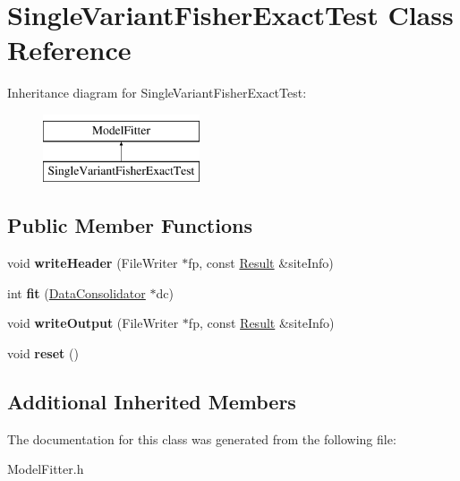 \hypertarget{classSingleVariantFisherExactTest}{\section{Single\-Variant\-Fisher\-Exact\-Test Class Reference}
\label{classSingleVariantFisherExactTest}
}
Inheritance diagram for Single\-Variant\-Fisher\-Exact\-Test\-:\begin{figure}[H]
\begin{center}
\leavevmode
\includegraphics[height=2.000000cm]{classSingleVariantFisherExactTest}
\end{center}
\end{figure}
\subsection*{Public Member Functions}
\begin{DoxyCompactItemize}
\item 
\hypertarget{classSingleVariantFisherExactTest_ac67f9a9f1d0ce580c1885af46f77e67e}{void {\bfseries write\-Header} (File\-Writer $\ast$fp, const \hyperlink{classResult}{Result} \&site\-Info)}\label{classSingleVariantFisherExactTest_ac67f9a9f1d0ce580c1885af46f77e67e}

\item 
\hypertarget{classSingleVariantFisherExactTest_ab746bc0d0464efab94f2369aa424027c}{int {\bfseries fit} (\hyperlink{classDataConsolidator}{Data\-Consolidator} $\ast$dc)}\label{classSingleVariantFisherExactTest_ab746bc0d0464efab94f2369aa424027c}

\item 
\hypertarget{classSingleVariantFisherExactTest_ac6515494462e8508a746bd1b28b65554}{void {\bfseries write\-Output} (File\-Writer $\ast$fp, const \hyperlink{classResult}{Result} \&site\-Info)}\label{classSingleVariantFisherExactTest_ac6515494462e8508a746bd1b28b65554}

\item 
\hypertarget{classSingleVariantFisherExactTest_a2380094c14667313baf3fcbf28a48ac9}{void {\bfseries reset} ()}\label{classSingleVariantFisherExactTest_a2380094c14667313baf3fcbf28a48ac9}

\end{DoxyCompactItemize}
\subsection*{Additional Inherited Members}


The documentation for this class was generated from the following file\-:\begin{DoxyCompactItemize}
\item 
Model\-Fitter.\-h\end{DoxyCompactItemize}
